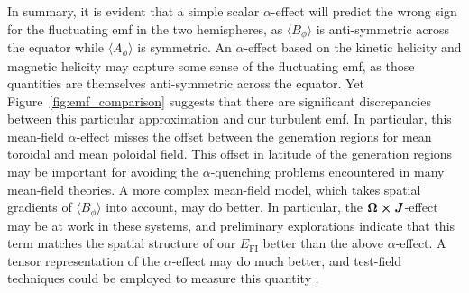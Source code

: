 In summary, it is evident that a simple scalar $\alpha$-effect will predict
the wrong sign for the fluctuating emf in the two hemispheres, as 
$\langle B_\phi \rangle$ is anti-symmetric across the equator while
$\langle A_\phi \rangle$ is symmetric.  
An $\alpha$-effect based on the kinetic helicity and magnetic helicity may
capture some sense of the fluctuating emf, as those quantities are
themselves anti-symmetric across the equator.
Yet Figure~\ref{fig:emf_comparison} suggests that there are significant discrepancies
between this particular approximation and our turbulent emf.  In
particular, this mean-field $\alpha$-effect misses
the offset between the generation regions for mean toroidal and mean
poloidal field.  This offset in latitude of the generation regions may
be important for avoiding the $\alpha$-quenching
problems encountered in many mean-field theories.
A more complex mean-field model, which takes spatial gradients
of $\langle B_\phi \rangle$ into account, may do better.  In
particular, the $\boldsymbol{\Omega} \boldsymbol{\times} \boldsymbol{J}$-effect
\citep[e.g.,][]{Moffatt&Proctor_1982, Rogachevskii&Kleeorin_2003}
may be at work in these systems, and preliminary explorations indicate
that this term matches the spatial structure of our $E_\mathrm{FI}$
better than the above $\alpha$-effect.  A tensor representation of the
$\alpha$-effect may do much better, and test-field techniques
could be employed to measure this quantity  \citetext{e.g.,
  \citealp{Schrinner_et_al_2005}, and recently reviewed in \citealp{Brandenburg_2009}}.


